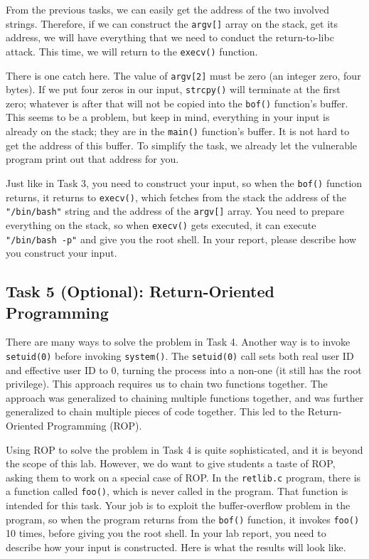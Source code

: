 From the previous tasks, we can easily get the address of the two involved 
strings. Therefore, if we can construct the \texttt{argv[]} array on the stack, 
get its address, we will have everything that we need to conduct the 
return-to-libc attack. This time, we will return to the \texttt{execv()} function. 

There is one catch here. The value of \texttt{argv[2]} must be zero (an integer zero, 
four bytes). If we put four zeros in our input, \texttt{strcpy()} will terminate
at the first zero; whatever is after that will not be copied into 
the \texttt{bof()} function's buffer. This seems to be a problem, but keep
in mind, everything in your input is already on the stack; they are in
the \texttt{main()} function's buffer. It is not hard to get the 
address of this buffer. To simplify the task, we already let the 
vulnerable program print out that address for you. 

Just like in Task 3, you need to construct your input, so when the \texttt{bof()}
function returns, it returns to \texttt{execv()}, which fetches from the stack
the address of the \texttt{"/bin/bash"} string and the address of the \texttt{argv[]} 
array. You need to prepare everything on the stack, so when \texttt{execv()}
gets executed, it can execute \texttt{"/bin/bash -p"} and give you the root shell. 
In your report, please describe how you construct your input. 



\subsection{Task 5 (Optional): Return-Oriented Programming}

There are many ways to solve the problem in Task 4. 
Another way is to invoke \texttt{setuid(0)} before 
invoking \texttt{system()}. The \texttt{setuid(0)} call sets both real user ID and  
effective user ID to 0, turning the process into a non-\setuid one (it still has 
the root privilege). This approach requires us to chain two functions
together. The approach was generalized to chaining multiple functions together, and 
was further generalized to chain multiple pieces of code together. 
This led to the Return-Oriented Programming (ROP). 

Using ROP to solve the problem in Task 4 is quite sophisticated, 
and it is beyond the scope of this lab. However, we do want to
give students a taste of ROP, asking them 
to work on a special case of ROP.
In the \texttt{retlib.c} program, there is a function called \texttt{foo()}, which 
is never called in the program. That function is intended for this task. Your job is 
to exploit the buffer-overflow problem in the program, so when the program
returns from the \texttt{bof()} function, it invokes \texttt{foo()} 10 times, before
giving you the root shell. In your lab report, you need to describe how your 
input is constructed.  Here is what the results will look like. 

